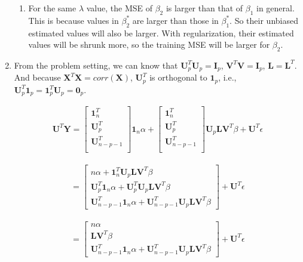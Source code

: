 \documentclass[paper=letter, fontsize=12pt]{article}
\begin{document}
\begin{enumerate}[label=(\alph*)]
\begin{enumerate}[label=(\arabic*)]
		\item For the same $\lambda$ value, the MSE of $\beta_2$ is larger than that of $\beta_1$ in general. This is because values in $\beta_2^*$ are larger than those in $\beta_1^*$. So their unbiased estimated values will also be larger. With regularization, their estimated values will be shrunk more, so the training MSE will be larger for $\beta_2$.
	\end{enumerate}
	
	\item 
	From the problem setting, we can know that $\mathbf{U}_{p}^{T} \mathbf{U}_{p} = \mathbf{I}_{p}$, $\mathbf{V}^T \mathbf{V} = \mathbf{I}_{p}$, $\mathbf{L} = \mathbf{L}^{T}$. And because $\mathbf{X}^{T} \mathbf{X} = corr(\mathbf{X})$, $\mathbf{U}^{T}_{p}$ is orthogonal to $\mathbf{1}_{p}$, i.e., $\mathbf{U}^{T}_{p} \mathbf{1}_{p} = \mathbf{1}^{T}_{p} \mathbf{U}_{p} = \mathbf{0}_p$.
	
	\begin{eqnarray*}
	\mathbf{U}^T \mathbf{Y} = 
		\begin{bmatrix}
			\mathbf{1}^T_{n} \\
			\mathbf{U}^T_p \\
			\mathbf{U}^{T}_{n-p-1}\\
 		\end{bmatrix} \mathbf{1}_n \alpha
 		+ 
 		\begin{bmatrix}
 		\mathbf{1}^T_{n} \\
 		\mathbf{U}^T_p \\
 		\mathbf{U}^{T}_{n-p-1}\\
 		\end{bmatrix} \mathbf{U}_{p} \mathbf{L} \mathbf{V}^T \beta
 		+ \mathbf{U}^T \epsilon
	\end{eqnarray*}

	\begin{eqnarray*}
	=  \begin{bmatrix}
			n\alpha + \mathbf{1}^T_{n} \mathbf{U}_{p} \mathbf{L} \mathbf{V}^T \beta \\
			\mathbf{U}^T_p \mathbf{1}_n \alpha + \mathbf{U}^T_p \mathbf{U}_{p} \mathbf{L} \mathbf{V}^T \beta \\
			\mathbf{U}^{T}_{n-p-1} \mathbf{1}_n \alpha + \mathbf{U}^{T}_{n-p-1} \mathbf{U}_{p} \mathbf{L} \mathbf{V}^T \beta
		\end{bmatrix} + \mathbf{U}^T \epsilon
	\end{eqnarray*}
	
	\begin{eqnarray*}
	= \begin{bmatrix}
			n\alpha \\
			\mathbf{L} \mathbf{V}^T \beta \\
			\mathbf{U}^{T}_{n-p-1} \mathbf{1}_n \alpha + \mathbf{U}^{T}_{n-p-1} \mathbf{U}_{p} \mathbf{L} \mathbf{V}^T \beta
		\end{bmatrix} + \mathbf{U}^T \epsilon
	\end{eqnarray*}


\end{enumerate}
\end{document}
